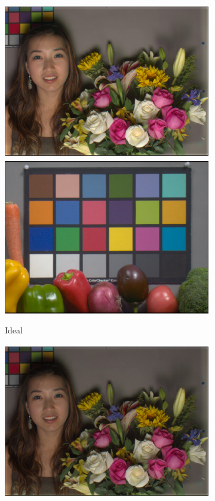 \documentclass[]{spie}
\begin{document}
\begin{figure}
\begin{center}
\begin{subfigure}[b]{0.3\textwidth}
    \includegraphics[width=\textwidth]{FaceId}
    \includegraphics[width=\textwidth]{VeggieId}
    \caption{Ideal}
\end{subfigure}
\begin{subfigure}[b]{0.3\textwidth}
    \includegraphics[width=\textwidth]{FaceFluXI}

\end{subfigure}
\end{center}
\end{figure}
\end{document}
